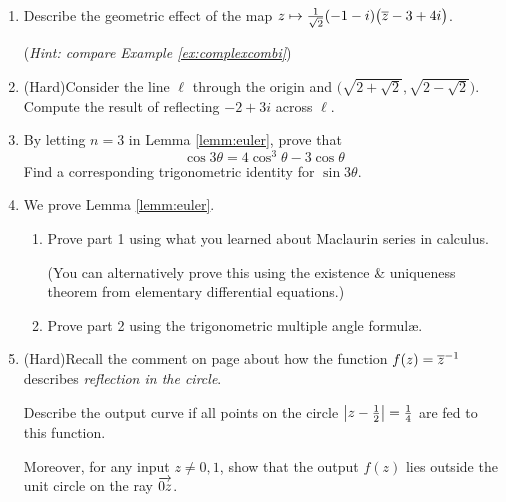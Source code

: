 \begin{exercises}
\begin{enumerate}
	  
	  \item Describe the geometric effect of the map $z\mapsto \frac 1{\sqrt 2}(-1-i)\bigl(\overline{z}-3+4i\bigr)$.\par
	  (\emph{Hint: compare Example \ref{ex:complexcombi}})
	  
	  
	  \item (Hard)\lstsp Consider the line $\ell$ through the origin and $\bigl(\sqrt{2+\sqrt 2},\sqrt{2-\sqrt 2}\bigr)$. Compute the result of reflecting $-2+3i$ across $\ell$.
	    
	      
	  \item By letting $n=3$ in Lemma \ref{lemm:euler}, prove that 
	  \[
	  	\cos 3\theta=4\cos^3\!\theta-3\cos\theta
	  \]
	  Find a corresponding trigonometric identity for $\sin 3\theta$.
	  	
 	
	 	\item We prove Lemma \ref{lemm:euler}.
	 	\begin{enumerate}
	 	  \item Prove part 1 using what you learned about Maclaurin series in calculus.\par
	 	  (You can alternatively prove this using the existence \& uniqueness theorem from elementary differential equations.)
	 	  \item Prove part 2 using the trigonometric multiple angle formulæ.
		\end{enumerate}
		
		
		\item (Hard)\lstsp Recall the comment on page \pageref{pg:refcircle} about how the function $f(z)=\overline{z}^{-1}$ describes \emph{reflection in the circle}.\par
		Describe the output curve if all points on the circle $\left| z-\frac 12\right|=\frac 14$ are fed to this function.\par
		Moreover, for any input $z\neq 0,1$, show that the output $f(z)$ lies outside the unit circle on the ray $\overrightarrow{0z}$. 	
	\end{enumerate}
 	
  
  

\end{exercises}

